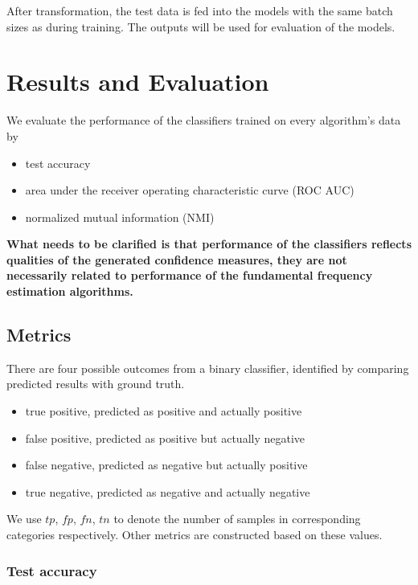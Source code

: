 \documentclass[11pt,a4paper]{report}
\begin{document}
\bigskip

After transformation, the test data is fed into the models with the same batch sizes as during training.
The outputs will be used for evaluation of the models.

\chapter{Results and Evaluation}

We evaluate the performance of the classifiers trained on every algorithm's data by

\begin{itemize}
  \item test accuracy
  \item area under the receiver operating characteristic curve (ROC AUC)
  \item normalized mutual information (NMI)
\end{itemize}

\begin{mdframed}
\textbf{What needs to be clarified is that performance of the classifiers reflects qualities of the generated confidence measures, they are not necessarily related to performance of the fundamental frequency estimation algorithms.}
\end{mdframed}

\section{Metrics}

There are four possible outcomes from a binary classifier, identified by comparing predicted results with ground truth.

\begin{itemize}
  \item true positive, predicted as positive and actually positive
  \item false positive, predicted as positive but actually negative
  \item false negative, predicted as negative but actually positive
  \item true negative, predicted as negative and actually negative
\end{itemize}

We use \(tp\), \(fp\), \(fn\), \(tn\) to denote the number of samples in corresponding categories respectively.
Other metrics are constructed based on these values.

\subsection{Test accuracy}
\end{document}
